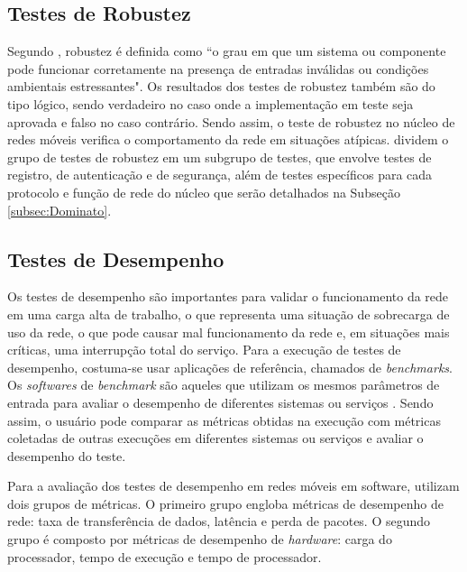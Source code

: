 \subsection{Testes de Robustez}

Segundo \cite[p.~64, tradução nossa]{IEEE.Standard.Glossary}, robustez é definida como ``o grau em que um sistema ou componente pode funcionar corretamente na presença de entradas inválidas ou condições ambientais estressantes".
Os resultados dos testes de robustez também são do tipo lógico, sendo verdadeiro no caso onde a implementação em teste seja aprovada e falso no caso contrário.
Sendo assim, o teste de robustez no núcleo de redes móveis verifica o comportamento da rede em situações atípicas. \cite{Dominato2021} dividem o grupo de testes de robustez em um subgrupo de testes, que envolve testes de registro, de autenticação e de segurança, além de testes específicos para cada protocolo e função de rede do núcleo que serão detalhados na Subseção \ref{subsec:Dominato}.

\subsection{Testes de Desempenho}

Os testes de desempenho são importantes para validar o funcionamento da rede em uma carga alta de trabalho, o que representa uma situação de sobrecarga de uso da rede, o que pode causar mal funcionamento da rede e, em situações mais críticas, uma interrupção total do serviço.
Para a execução de testes de desempenho, costuma-se usar aplicações de referência, chamados de \textit{benchmarks}.
Os \textit{softwares} de \textit{benchmark} são aqueles que utilizam os mesmos parâmetros de entrada para avaliar o desempenho de diferentes sistemas ou serviços \cite{Boano2018}.
Sendo assim, o usuário pode comparar as métricas obtidas na execução com métricas coletadas de outras execuções em diferentes sistemas ou serviços e avaliar o desempenho do teste.

Para a avaliação dos testes de desempenho em redes móveis em software, \cite{Lee2021} utilizam dois grupos de métricas.
O primeiro grupo engloba métricas de desempenho de rede: taxa de transferência de dados, latência e perda de pacotes.
O segundo grupo é composto por métricas de desempenho de \textit{hardware}: carga do processador, tempo de execução e tempo de processador.

